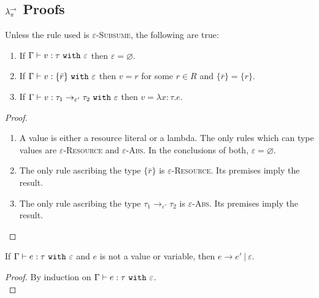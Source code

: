 \begin{appendix}

\chapter{$\lambda^{\rightarrow}_{\pi}$ Proofs}

\begin{lemma}
Unless the rule used is \textsc{$\varepsilon$-Subsume}, the following are true:
\begin{enumerate}
	\setlength\itemsep{-0.7em}
	\item If $ \Gamma \vdash  v:  \tau~\mathtt{with}~ \varepsilon$ then $\varepsilon = \varnothing$.
	\item If $ \Gamma \vdash v: \{ \bar r \}~\mathtt{with}~ \varepsilon$ then $ v = r$ for some $r \in R$ and $\{ \bar r \} = \{ r \}$.
	\item If $\Gamma \vdash v: \tau_1 \rightarrow_{\varepsilon'} \tau_2~\mathtt{with}~ \varepsilon$ then $v = \lambda x:\tau. e$.
\end{enumerate}
\end{lemma}

\begin{proof}
~
\begin{enumerate}
	\setlength\itemsep{-0.7em}
	\item A value is either a resource literal or a lambda. The only rules which can type values are \textsc{$\varepsilon$-Resource} and \textsc{$\varepsilon$-Abs}. In the conclusions of both, $\varepsilon = \varnothing$.
	\item The only rule ascribing the type $\{ \bar r \}$ is \textsc{$\varepsilon$-Resource}. Its premises imply the result.
	\item The only rule ascribing the type $\tau_1 \rightarrow_{\varepsilon'} \tau_2$ is \textsc{$\varepsilon$-Abs}. Its premises imply the result.
\end{enumerate}
\end{proof}

\hrulefill


\begin{theorem}[Progress]
If $ \Gamma \vdash  e:  \tau~\mathtt{with}~ \varepsilon$ and $ e$ is not a value or variable, then $ e \longrightarrow  e'~|~\varepsilon$.
\end{theorem}

\begin{proof} By induction on $ \Gamma \vdash  e:  \tau~\mathtt{with}~ \varepsilon$. \\


\end{proof}
\end{appendix}
